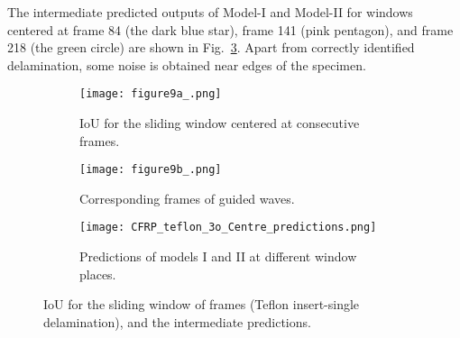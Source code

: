 \begin{sloppypar}
	The intermediate predicted outputs of Model-I and Model-II for windows centered at frame 84 (the dark blue star), frame 141 (pink pentagon), and frame 218 (the green circle) are shown in Fig.~\ref{fig:CFRP_teflon_3o_intermediate}.
	Apart from correctly identified delamination, some noise is obtained near edges of the specimen.
	\begin{figure} [!ht]
		\begin{subfigure}[b]{1\textwidth}
			\centering
			\texttt{[image: figure9a\_.png]}
			\caption{IoU for the sliding window centered at consecutive frames.}
			\label{fig:CFRP_Teflon_3o_IoU_}
		\end{subfigure}
		\par\medskip
		\begin{subfigure}[b]{1\textwidth}
			\centering
			\texttt{[image: figure9b\_.png]}
			\caption{Corresponding frames of guided waves.} 
			\label{fig:CFRP_teflon_3o_shapes_}
		\end{subfigure}
		\par\medskip
		\begin{subfigure}[b]{1\textwidth}
			\centering
			\texttt{[image: CFRP\_teflon\_3o\_Centre\_predictions.png]}
			\caption{Predictions of models I and II at different window places.} 
			\label{fig:CFRP_teflon_3o_intermediate}
		\end{subfigure}
		\caption{IoU for the sliding window of frames (Teflon insert-single delamination), and the intermediate predictions.}
		\label{fig:CFRP_Teflon_3o_IoU_centre_window}
	\end{figure} 
	

\end{sloppypar}
